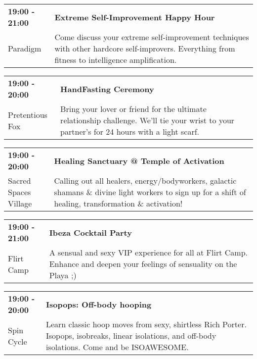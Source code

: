 \begin{tabular}{ p{1in} p{2.2in} }
    \textbf{19:00 - 21:00} & \textbf{Extreme Self-Improvement Happy Hour} \\
    Paradigm \newline  & Come discuss your extreme self-improvement techniques with other hardcore self-improvers. Everything from fitness to intelligence amplification. \\
    \hline 
\end{tabular}
    
\begin{tabular}{ p{1in} p{2.2in} }
    \textbf{19:00 - 20:00} & \textbf{HandFasting Ceremony} \\
    Pretentious Fox \newline  & Bring your lover or friend for the ultimate relationship challenge. We'll tie your wrist to your partner's for 24 hours with a light scarf. \\
    \hline 
\end{tabular}
    
\begin{tabular}{ p{1in} p{2.2in} }
    \textbf{19:00 - 20:00} & \textbf{Healing Sanctuary @ Temple of Activation} \\
    Sacred Spaces Village \newline  & Calling out all healers, energy/bodyworkers, galactic shamans \& divine light workers to sign up for a shift of healing, transformation \& activation! \\
    \hline 
\end{tabular}
    
\begin{tabular}{ p{1in} p{2.2in} }
    \textbf{19:00 - 21:00} & \textbf{Ibeza Cocktail Party} \\
    Flirt Camp \newline  & A sensual and sexy VIP experience for all at Flirt Camp. Enhance and deepen your feelings of sensuality on the Playa ;) \\
    \hline 
\end{tabular}
    
\begin{tabular}{ p{1in} p{2.2in} }
    \textbf{19:00 - 20:00} & \textbf{Isopops: Off-body hooping} \\
    Spin Cycle \newline  & Learn classic hoop moves from sexy, shirtless Rich Porter. Isopops, isobreaks, linear isolations, and off-body isolations. Come and be ISOAWESOME. \\
    \hline 
\end{tabular}
    
